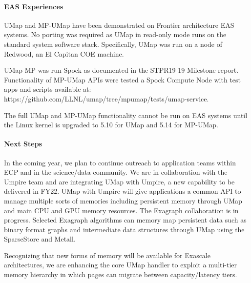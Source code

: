 \paragraph{EAS Experiences}

UMap and MP-UMap have been demonstrated on Frontier architecture EAS
systems. No porting was required as UMap in read-only mode runs on the
standard system software stack. Specifically, UMap was run on a node
of Redwood, an El Capitan COE machine.

  UMap-MP was run Spock as documented in the STPR19-19 Milestone
  report. Functionality of MP-UMap APIs were tested a Spock Compute
  Node with test apps and scripts available at:
https://github.com/LLNL/umap/tree/mpumap/tests/umap-service.

The full UMap and MP-UMap functionality cannot be run on EAS systems
until the Linux kernel is upgraded to 5.10 for UMap and 5.14 for MP-UMap.

\paragraph{Next Steps}
In the coming year, we plan to continue outreach to application teams
within ECP and in the science/data community. We are in collaboration
with the Umpire team and are integrating UMap with Umpire, a new
capability to be delivered in FY22. UMap with Umpire will give
applications a common API to manage multiple sorts of memories
including persistent memory through UMap and main CPU and GPU memory
resources. The Exagraph collaboration is in progress. Selected
Exagraph algorithms can memory map persistent data such as
binary format graphs and intermediate data structures through UMap
using the SparseStore and Metall.

Recognizing that new forms of memory will be available for Exascale
architectures, we are enhancing the core UMap handler to exploit a
multi-tier memory hierarchy in which pages can migrate between
capacity/latency tiers.

